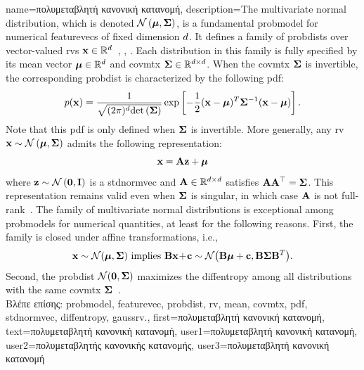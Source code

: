 {name={\foreignlanguage{greek}{πολυμεταβλητή κανονική κατανομή}}, 
	description={The multivariate normal distribution, 
		which is denoted $\mathcal{N}\left({\bm \mu},{\bf \Sigma}\right)$, is a fundamental 
		\gls{probmodel} for numerical \gls{featurevec}s of fixed dimension $d$. 
		It defines a family of \gls{probdist}s over vector-valued \gls{rv}s 
		${\bf x} \in \mathbb{R}^{d}$~\cite{BertsekasProb}, \cite{GrayProbBook}, \cite{Lapidoth09}. 
		Each distribution in this family is fully specified by its \gls{mean} vector 
		${\bm \mu} \in \mathbb{R}^{d}$ and \gls{covmtx} 
		${\bf \Sigma} \in \mathbb{R}^{d \times d}$. When the 
		\gls{covmtx} ${\bf \Sigma}$ is invertible, the corresponding \gls{probdist} is 
		characterized by the following \gls{pdf}:
		\[p({\bf x}) = 
 		\frac{1}{\sqrt{(2\pi)^{d} {\rm det}\left( {\bf \Sigma} \right)}} 
 		\exp\left[ -\frac{1}{2} 
 		({\bf x} - {\bm \mu})^T {\bf \Sigma}^{-1} 
 		({\bf x} - {\bm \mu}) \right].
 		\]
		Note that this \gls{pdf} is only defined when ${\bf \Sigma}$ is invertible.
   		More generally, any \gls{rv} ${\bf x} \sim \mathcal{N}\left({\bm \mu},{\bf \Sigma}\right)$ 
   		admits the following representation:
  		\[
    		{\bf x} = {\bf A} {\bf z} + {\bm \mu}
   		\]
   		where ${\bf z} \sim \mathcal{N}\left(\mathbf{0},\mathbf{I}\right)$ is a \gls{stdnormvec} 
   		and ${\bf A} \in \mathbb{R}^{d \times d}$ satisfies ${\bf A} {\bf A}^\top = {\bf \Sigma}$. 
   		This representation remains valid even when ${\bf \Sigma}$ is singular, in which case ${\bf A}$ 
   		is not full-rank~\cite[Ch. 23]{Lapidoth2017}.
   		The family of multivariate normal distributions is exceptional among \gls{probmodel}s for numerical 
   		quantities, at least for the following reasons. First, the family is closed under affine 
   		transformations, i.e.,
		\[ 
		{\bf x} \sim \mathcal{N}({\bm \mu},{\bf \Sigma}) \mbox{ implies } 
		{\bf B}{\bf x}\!+\!{\bf c} \sim \mathcal{N}\big( {\bf B}{\bm \mu}+{\bf c},{\bf B} {\bf \Sigma} {\bf B}^{T} \big). 
		\]
		Second, the \gls{probdist} $\mathcal{N}(\mathbf{0},{\bf \Sigma})$ maximizes the 
		\gls{diffentropy} among all distributions with the same \gls{covmtx} ${\bf \Sigma}$~\cite{coverthomas}.  \\ 
		\foreignlanguage{greek}{Βλέπε επίσης:} \gls{probmodel}, \gls{featurevec}, \gls{probdist}, \gls{rv}, \gls{mean}, \gls{covmtx}, 
		\gls{pdf}, \gls{stdnormvec}, \gls{diffentropy}, \gls{gaussrv}.}, 
	first={\foreignlanguage{greek}{πολυμεταβλητή κανονική κατανομή}},
	text={\foreignlanguage{greek}{πολυμεταβλητή κανονική κατανομή}},
	user1={\foreignlanguage{greek}{πολυμεταβλητή κανονική κατανομή}}, %
	user2={\foreignlanguage{greek}{πολυμεταβλητής κανονικής κατανομής}}, %
	user3={\foreignlanguage{greek}{πολυμεταβλητή κανονική κατανομή}} %
}

